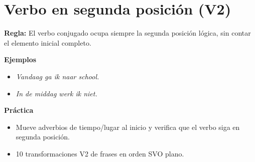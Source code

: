 \section{Verbo en segunda posición (V2)}
\textbf{Regla:} El verbo conjugado ocupa siempre la segunda posición lógica, sin contar el elemento inicial completo.

\textbf{Ejemplos}
\begin{itemize}[leftmargin=*]
  \item \textit{Vandaag ga ik naar school.}
  \item \textit{In de middag werk ik niet.}
\end{itemize}

\textbf{Práctica}
\begin{itemize}[leftmargin=*]
  \item Mueve adverbios de tiempo/lugar al inicio y verifica que el verbo siga en segunda posición.
  \item 10 transformaciones V2 de frases en orden SVO plano.
\end{itemize}
